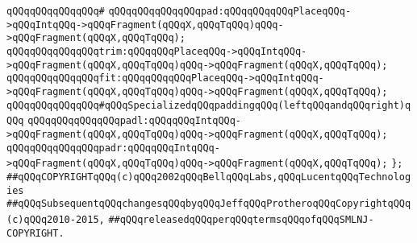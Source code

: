 \verb|qQQqqQQqqQQqqQQq#|\newline
\verb|qQQqqQQqqQQqqQQqpad:qQQqqQQqqQQqPlaceqQQq->qQQqIntqQQq->qQQqFragment(qQQqX,qQQqTqQQq)qQQq->qQQqFragment(qQQqX,qQQqTqQQq);|\newline
\verb|qQQqqQQqqQQqqQQqtrim:qQQqqQQqPlaceqQQq->qQQqIntqQQq->qQQqFragment(qQQqX,qQQqTqQQq)qQQq->qQQqFragment(qQQqX,qQQqTqQQq);|\newline
\verb|qQQqqQQqqQQqqQQqfit:qQQqqQQqqQQqPlaceqQQq->qQQqIntqQQq->qQQqFragment(qQQqX,qQQqTqQQq)qQQq->qQQqFragment(qQQqX,qQQqTqQQq);|\newline
\newline
\verb|qQQqqQQqqQQqqQQq#qQQqSpecializedqQQqpaddingqQQq(leftqQQqandqQQqright)qQQq|\newline
\verb|qQQqqQQqqQQqqQQqpadl:qQQqqQQqIntqQQq->qQQqFragment(qQQqX,qQQqTqQQq)qQQq->qQQqFragment(qQQqX,qQQqTqQQq);|\newline
\verb|qQQqqQQqqQQqqQQqpadr:qQQqqQQqIntqQQq->qQQqFragment(qQQqX,qQQqTqQQq)qQQq->qQQqFragment(qQQqX,qQQqTqQQq);|\newline
\newline
\verb|};|\newline
\newline
\newline
\newline
\verb|##qQQqCOPYRIGHTqQQq(c)qQQq2002qQQqBellqQQqLabs,qQQqLucentqQQqTechnologies|\newline
\verb|##qQQqSubsequentqQQqchangesqQQqbyqQQqJeffqQQqProtheroqQQqCopyrightqQQq(c)qQQq2010-2015,|\newline
\verb|##qQQqreleasedqQQqperqQQqtermsqQQqofqQQqSMLNJ-COPYRIGHT.|\newline

